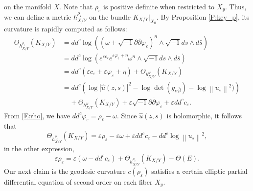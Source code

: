 \documentclass{amsart}
\theoremstyle{definition}
\numberwithin{equation}{section}
\begin{document}
on the manifold $X$. Note that $\rho_\varepsilon$ is positive definite when restricted to $X_y$. Thus, we can define a metric $h^{\rho_\varepsilon}_{X/Y}$ on the bundle $K_{X/Y}\vert_{X_0}$. By Proposition \ref{P:key_p}, its curvature is rapidly computed as follows:
\begin{align*}
\Theta_{h^{\rho_\varepsilon}_{X/Y}}(K_{X/Y})
& =
dd^c\log
{\left({
	(\omega+{\sqrt{-1}}{\partial\bar\partial}\varphi_\varepsilon)^n\wedge{\sqrt{-1}} ds\wedge d\bar s
}\right)} 
\\
& =
dd^c\log
{\left({
	e^{\varepsilon c_\varepsilon}
	e^{\varepsilon\varphi_\epsilon+\eta}
	\omega^n\wedge{\sqrt{-1}} ds\wedge d\bar s}\right)} \\
& = 
dd^c(\varepsilon c_\varepsilon+\varepsilon\varphi_\varepsilon+\eta)
+
\Theta_{h^\omega_{X/Y}}(K_{X/Y}) \\
& =
dd^c{\left({\log{\left\vert{\hat u(z,s)}\right\vert}^2-\log\det(g_{\alpha\bar\beta})-\log{\left\|{u_s}\right\|}^2)}\right)} \\
&
\;\;\;\;+\Theta_{h^\omega_{X/Y}}(K_{X/Y})
+
\varepsilon{\sqrt{-1}}{\partial\bar\partial}\varphi_\varepsilon
+ 
{\varepsilon} dd^c c_\varepsilon.
\end{align*}
From \eqref{E:rho}, we have $dd^c\varphi_\varepsilon=\rho_\varepsilon-\omega$. 
Since $\hat u(z,s)$ is holomorphic, it follows that
\begin{equation}\label{E:Ricci}
\Theta_{h^{\rho_\varepsilon}_{X/Y}}(K_{X/Y})
=
\varepsilon{\rho_\varepsilon}
-
\varepsilon\omega
+ 
{\varepsilon} dd^c c_\varepsilon
-
dd^c\log{\left\|{u_s}\right\|}^2,
\end{equation}
in the other expression,
\begin{equation*}
{\varepsilon}{\rho_\varepsilon}
=
{\varepsilon}{\left({
	\omega-dd^c c_\varepsilon
}\right)}
+
\Theta_{h^{\rho_\varepsilon}_{X/Y}}(K_{X/Y})
-
\Theta(E).
\end{equation*}
Our next claim is the geodesic curvature $c(\rho_{\varepsilon})$ satisfies a certain elliptic partial differential equation of second order on each fiber $X_y$. 
\end{document}
